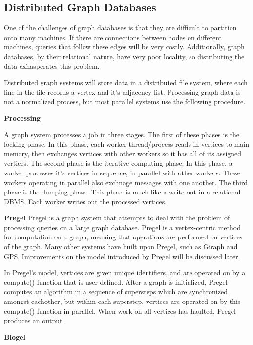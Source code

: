 \subsection*{Distributed Graph Databases}


One of the challenges of graph databases is that they are difficult to partition onto many machines. If there are connections between nodes on different machines, queries that follow these edges will be very costly. Additionally, graph databases, by their relational nature, have very poor locality, so distributing the data exhasperates this problem\cite{parallelgraph}. 



Distributed graph systems will store data in a distributed file system, where each line in the file records a vertex and it's adjacency list. Processing graph data is not a normalized process, but most parallel systems use the following procedure\cite{blogel}.
\par
\textbf{Processing}
\par
A graph system processes a job in three stages.
The first of these phases is the locking phase. In this phase, each worker thread/process reads in vertices to main memory, then exchanges vertices with other workers so it has all of its assigned vertices.
The second phase is the iterative computing phase. In this phase, a worker processes it's vertices in sequence, in parallel with other workers. These workers operating in parallel also exchnage messages with one another.
The third phase is the dumping phase. This phase is much like a write-out in a relational DBMS. Each worker writes out the processed vertices\cite{blogel}\cite{pregel}.
\par
\textbf{Pregel}
Pregel is a graph system that attempts to deal with the problem of processing queries on a large graph database. Pregel is a vertex-centric method for computation on a graph, meaning that operations are performed on vertices of the graph. Many other systems have built upon Pregel, such as Giraph and GPS. Improvements on the model introduced by Pregel will be discussed later.


In Pregel's model, vertices are given unique identifiers, and are operated on by a compute() function that is user defined. After a graph is initialized, Pregel computes an algorithm in a sequence of supersteps which are synchronized amongst eachother, but within each superstep, vertices are operated on by this compute() function in parallel. When work on all vertices has haulted, Pregel produces an output\cite{pregel}.


\par
\par
\textbf{Blogel}
\par
